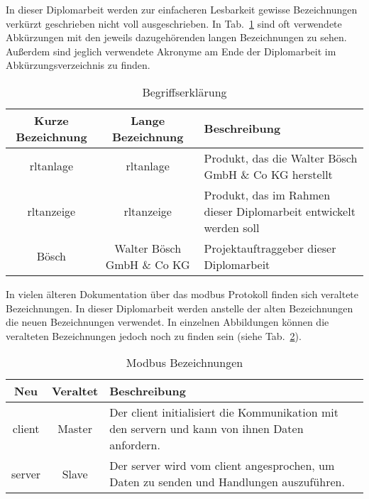  \label{begriffserklaerung}

\noindent In dieser Diplomarbeit werden zur einfacheren Lesbarkeit gewisse Bezeichnungen verkürzt geschrieben \bzw nicht voll ausgeschrieben. In Tab.~\ref{tab:begriffserklaerung} sind oft verwendete Abkürzungen mit den jeweils dazugehörenden langen Bezeichnungen zu sehen. Außerdem sind jeglich verwendete Akronyme am Ende der Diplomarbeit im Abkürzungsverzeichnis zu finden. 
\begin{table}[h]
	\caption{Begriffserklärung \label{tab:begriffserklaerung}}
	\begin{tabularx}{\textwidth}{@{}c|c|X@{}}
		\toprule
		\textbf{Kurze Bezeichnung} & \textbf{Lange Bezeichnung} & \textbf{Beschreibung} \\
		\midrule
        \acs{rltanlage} & \Acl{rltanlage} &  Produkt, das die Walter Bösch GmbH \& Co KG herstellt \\
		\acs{rltanzeige} & \acl{rltanzeige} &  Produkt, das im Rahmen dieser Diplomarbeit entwickelt werden soll \\
		Bösch & Walter Bösch GmbH \& Co KG & Projektauftraggeber dieser Diplomarbeit \\
		\bottomrule
	\end{tabularx}
\end{table}


In vielen älteren Dokumentation über das \gls{modbus} Protokoll finden sich veraltete Bezeichnungen. In dieser Diplomarbeit werden anstelle der alten Bezeichnungen die neuen Bezeichnungen verwendet. In einzelnen Abbildungen können die veralteten Bezeichnungen jedoch noch zu finden sein (siehe Tab.~\ref{tab:modbus_bezeichnung}). 
\begin{table}[h]
	\caption{Modbus Bezeichnungen \label{tab:modbus_bezeichnung}}
	\begin{tabularx}{\textwidth}{@{}c|c|X@{}}
		\toprule
		\textbf{Neu} & \textbf{Veraltet} & \textbf{Beschreibung} \\
		\midrule
		\gls{client} & Master & Der \gls{client} initialisiert die Kommunikation mit den \gls{server}n und kann von ihnen Daten anfordern. \\
		\gls{server} & Slave & Der \gls{server} wird vom \gls{client} angesprochen, um Daten zu senden und Handlungen auszuführen. \\
		\bottomrule
	\end{tabularx}
\end{table}


